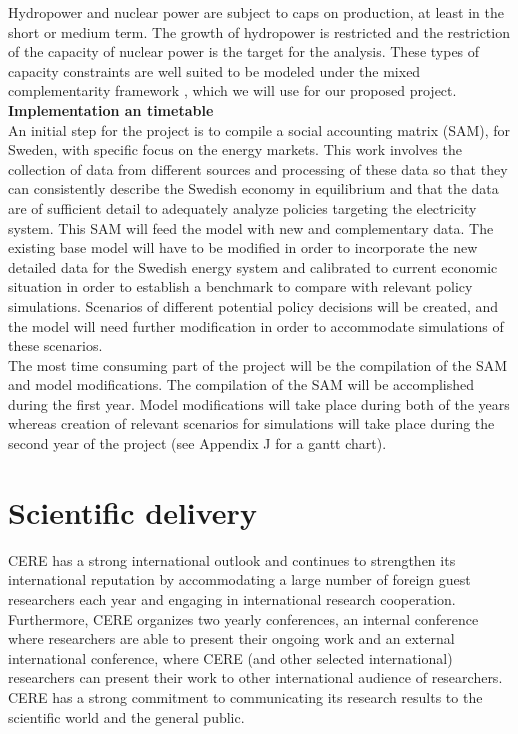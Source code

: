Hydropower and nuclear power are subject to caps on production, at least in the short or medium term. The growth of hydropower is restricted and the restriction of the capacity of nuclear power is the target for the analysis. These types of capacity constraints are well suited to be modeled under the mixed complementarity framework \citep{raey}, which we will use for our proposed project.\\
\textbf{Implementation an timetable}\\
An initial step for the project is to compile a social accounting matrix (SAM), for Sweden, with specific focus on the energy markets. This work involves the collection of data from different sources and processing of these data so that they can consistently describe the Swedish economy in equilibrium and that the data are of sufficient detail to adequately analyze policies targeting the electricity system. This SAM will feed the model with new and complementary data.
The existing base model will have to be modified in order to incorporate the new detailed data for the Swedish energy system and calibrated to current economic situation in order to establish a benchmark to compare with relevant policy simulations. Scenarios of different potential policy decisions will be created, and the model will need further modification in order to accommodate simulations of these scenarios.\\
The most time consuming part of the project will be the compilation of the SAM and model modifications. The compilation of the SAM will be accomplished during the first year. Model modifications will take place during both of the years whereas creation of relevant scenarios for simulations will take place during the second year of the project (see Appendix J for a gantt chart).\\

\section{Scientific delivery}
CERE has a strong international outlook and continues to strengthen its international reputation by accommodating a large number of foreign guest researchers each year and engaging in international research cooperation. Furthermore, CERE organizes two yearly conferences, an internal conference where researchers are able to present their ongoing work and an external international conference, where CERE (and other selected international) researchers can present their work to other international audience of researchers. CERE has a strong commitment to communicating its research results to the scientific world and the general public.

